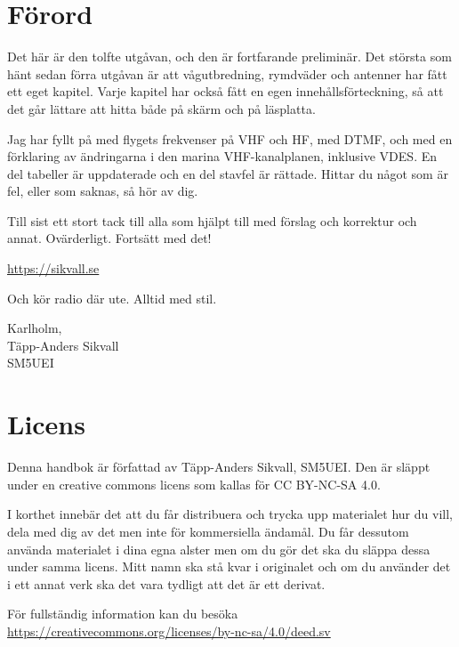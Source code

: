 
\section{Förord}

Det här är den tolfte utgåvan, och den är fortfarande preliminär. Det
största som hänt sedan förra utgåvan är att vågutbredning, rymdväder
och antenner har fått ett eget kapitel. Varje kapitel har också fått
en egen innehållsförteckning, så att det går lättare att hitta både
på skärm och på läsplatta.

Jag har fyllt på med flygets frekvenser på VHF och HF, med DTMF, och
med en förklaring av ändringarna i den marina VHF-kanalplanen,
inklusive VDES. En del tabeller är uppdaterade och en del stavfel är
rättade. Hittar du något som är fel, eller som saknas, så hör av dig.

Till sist ett stort tack till alla som hjälpt till med förslag och korrektur
och annat. Ovärderligt. Fortsätt med det!

\url{https://sikvall.se}

Och kör radio där ute. Alltid med stil.

\vspace{4mm}

\noindent Karlholm, \DokumentDatum\\
Täpp-Anders Sikvall\\
	SM5UEI


\section{Licens}

Denna handbok är författad av Täpp-Anders Sikvall, SM5UEI. Den är
släppt under en creative commons licens som kallas för CC BY-NC-SA 4.0.

I korthet innebär det att du får distribuera och trycka upp materialet
hur du vill, dela med dig av det men inte för kommersiella ändamål. Du
får dessutom använda materialet i dina egna alster men om du gör det
ska du släppa dessa under samma licens. Mitt namn ska stå kvar i
originalet och om du använder det i ett annat verk ska det vara
tydligt att det är ett derivat.

För fullständig information kan du besöka\\
\url{https://creativecommons.org/licenses/by-nc-sa/4.0/deed.sv}

